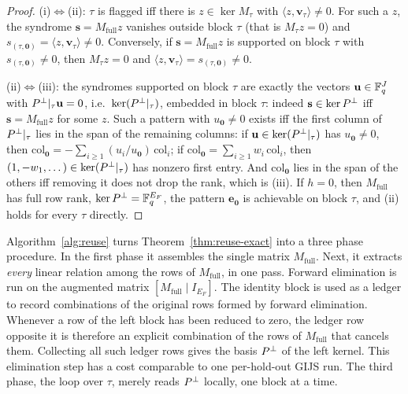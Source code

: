 \begin{proof}
(i)$\iff$(ii): $\tau$ is flagged iff there is $z\in\ker M_\tau$ with
$\langle z,\mathbf{v}_\tau\rangle \neq 0$. For such a $z$, the
syndrome $\mathbf{s} = M_{\mathrm{full}}z$ vanishes outside block
$\tau$ (that is $M_\tau z = 0$) and
$s_{(\tau,\mathbf{0})} = \langle z, \mathbf{v}_\tau\rangle \neq 0$.
Conversely, if $\mathbf{s} = M_{\mathrm{full}} z$ is supported on
block $\tau$ with $s_{(\tau,\mathbf{0})}\neq 0$, then $M_\tau z = 0$
and $\langle z,\mathbf{v}_\tau\rangle = s_{(\tau,\mathbf{0})} \neq 0$.

(ii)$\iff$(iii): the syndromes supported on block $\tau$ are exactly
the vectors $\mathbf{u}\in\mathbb{F}_q^{J}$ with $P^{\perp}|_\tau \mathbf{u} = 0$,
i.e.\ $\ker(P^{\perp}|_\tau)$, embedded in block $\tau$: indeed
$\mathbf{s}\in\ker P^{\perp}$ iff $\mathbf{s} = M_{\mathrm{full}} z$ for
some $z$. Such a pattern with $u_{\mathbf{0}} \neq 0$ exists iff the
first column of $P^{\perp}|_\tau$ lies in the span of the remaining
columns: if $\mathbf{u}\in\ker(P^{\perp}|_\tau)$ has
$u_{\mathbf{0}}\neq 0$, then $\mathrm{col}_{\mathbf{0}} =
-\sum_{i\geq 1} (u_i/u_{\mathbf{0}})\,\mathrm{col}_i$; if
$\mathrm{col}_{\mathbf{0}} = \sum_{i\geq 1} w_i\,\mathrm{col}_i$,
then $(1,-w_1,\dots)\in\ker(P^{\perp}|_\tau)$ has nonzero first entry.
And $\mathrm{col}_{\mathbf{0}}$ lies in the span of the others iff
removing it does not drop the rank, which is (iii). If $h=0$, then
$M_{\mathrm{full}}$ has full row rank, $\ker P^{\perp} = \mathbb{F}_q^{E_F}$, the
pattern $\mathbf{e}_{\mathbf{0}}$ is achievable on block $\tau$, and
(ii) holds for every $\tau$ directly.
\end{proof}

Algorithm~\ref{alg:reuse} turns Theorem~\ref{thm:reuse-exact} into a three phase
procedure. In the first
phase it assembles the single matrix $M_{\mathrm{full}}$.
Next, it extracts \emph{every} linear relation
among the rows of $M_{\mathrm{full}}$, in one pass. Forward
elimination is run on the augmented matrix
$[M_{\mathrm{full}} \mid I_{E_F}]$. The identity block
is used as a ledger to record combinations
of the original rows formed by forward elimination. Whenever a row of the
left block has been reduced to zero, the ledger row opposite it is
therefore an explicit combination of the rows of
$M_{\mathrm{full}}$ that cancels them.
Collecting all such ledger rows gives the basis $P^{\perp}$ of the left
kernel. This elimination step has a cost comparable
to one per-hold-out GIJS run. The third
phase, the loop over $\tau$, merely reads $P^{\perp}$ locally, one block
at a time.

